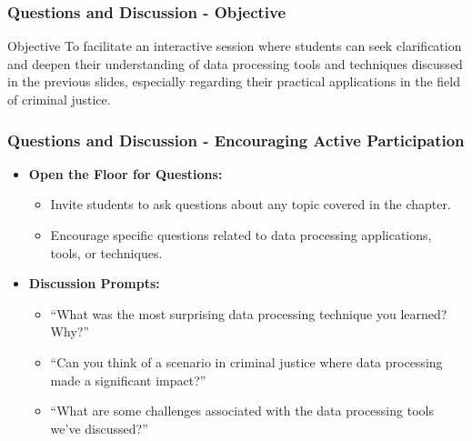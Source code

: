 \documentclass[aspectratio=169]{beamer}
\begin{document}
\begin{frame}[fragile]
    \frametitle{Questions and Discussion - Objective}
    \begin{block}{Objective}
        To facilitate an interactive session where students can seek clarification and deepen their understanding of data processing tools and techniques discussed in the previous slides, especially regarding their practical applications in the field of criminal justice.
    \end{block}
\end{frame}

\begin{frame}[fragile]
    \frametitle{Questions and Discussion - Encouraging Active Participation}
    \begin{itemize}
        \item \textbf{Open the Floor for Questions:}
            \begin{itemize}
                \item Invite students to ask questions about any topic covered in the chapter.
                \item Encourage specific questions related to data processing applications, tools, or techniques.
            \end{itemize}
        \item \textbf{Discussion Prompts:}
            \begin{itemize}
                \item “What was the most surprising data processing technique you learned? Why?”
                \item “Can you think of a scenario in criminal justice where data processing made a significant impact?”
                \item “What are some challenges associated with the data processing tools we've discussed?”
            \end{itemize}
    \end{itemize}
\end{frame}
\end{document}
